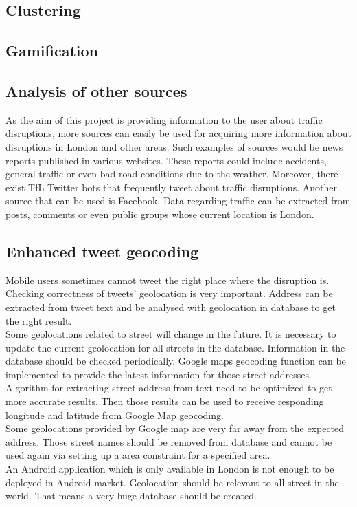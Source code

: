 \subsection{Clustering}

\subsection{Gamification}

\subsection{Analysis of other sources}
As the aim of this project is providing information to the user about traffic disruptions, more sources can 
easily be used for acquiring more information about disruptions in London and other areas. Such examples 
of sources would be news reports published in various websites. These reports could include accidents, general traffic or even 
bad road conditions due to the weather. Moreover, there exist TfL Twitter bots that frequently tweet
about traffic disruptions. Another source that can be used is Facebook. Data regarding traffic can be
extracted from posts, comments or even public groups whose current location is London.

\subsection{Enhanced tweet geocoding}
Mobile users sometimes cannot tweet the right place where the disruption is. Checking correctness of tweets' geolocation is very important. Address can be extracted from tweet text and be analysed with geolocation in database to get the right result.\\
Some geolocations related to street will change in the future. It is necessary to update the current geolocation for all streets in the database. Information in the database should be checked periodically. Google maps geocoding function can be implemented to provide the latest information for those street addresses.\\
Algorithm for extracting street address from text need to be optimized to get more accurate results. Then those results can be used to receive responding longitude and latitude from Google Map geocoding.\\
Some geolocations provided by Google map are very far away from the expected address. Those street names should be removed from database and cannot be used again via setting up a area constraint for a specified area.\\
An Android application which is only available in London is not enough to be deployed in Android market. Geolocation should be relevant to all street in the world. That means a very huge database should be created.